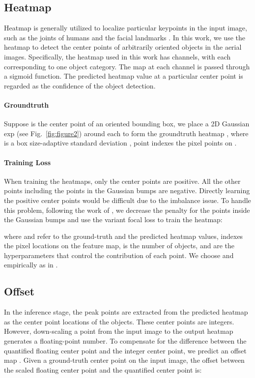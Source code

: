\documentclass[10pt,twocolumn,letterpaper]{article}
\begin{document}
\subsection{Heatmap}
\label{sub:heatmap}
Heatmap is generally utilized to localize particular keypoints in the input image, such as the joints of humans and the facial landmarks \cite{merget2018robust,newell2016stacked,sun2018integral}. In this work, we use the heatmap to detect the center points of arbitrarily oriented objects in the aerial images. Specifically, the heatmap  used in this work has  channels, with each corresponding to one object category. The map at each channel is passed through a sigmoid function. The predicted heatmap value at a particular center point is regarded as the confidence of the object detection.

\paragraph{Groundtruth} Suppose  is the center point of an oriented bounding box, we place a 2D Gaussian  exp (see Fig.~\ref{fig:figure2}) around each  to form the groundtruth heatmap , where  is a box size-adaptive standard deviation \cite{zhou2019objects,law2018cornernet}, point  indexes the pixel points on .

\paragraph{Training Loss} When training the heatmaps, only the center points  are positive. All the other points including the points in the Gaussian bumps are negative. Directly learning the positive center points would be difficult due to the imbalance issue. To handle this problem, following the work of \cite{law2018cornernet}, we decrease the penalty for the points inside the Gaussian bumps and use the variant focal loss to train the heatmap:

where   and  refer to the ground-truth and the predicted heatmap values,  indexes the pixel locations on the feature map,  is the number of objects,  and  are the hyperparameters that control the contribution of each point. We choose  and  empirically as in \cite{law2018cornernet}.

\subsection{Offset}
\label{sub:offsets}
In the inference stage, the peak points are extracted from the predicted heatmap  as the center point locations of the objects. These center points  are integers. However, down-scaling a point from the input image to the output heatmap generates a floating-point number. To compensate for the difference between the quantified floating center point and the integer center point, we predict an offset map . Given a ground-truth center point  on the input image, the offset between the scaled floating center point and the quantified center point is:
\end{document}
